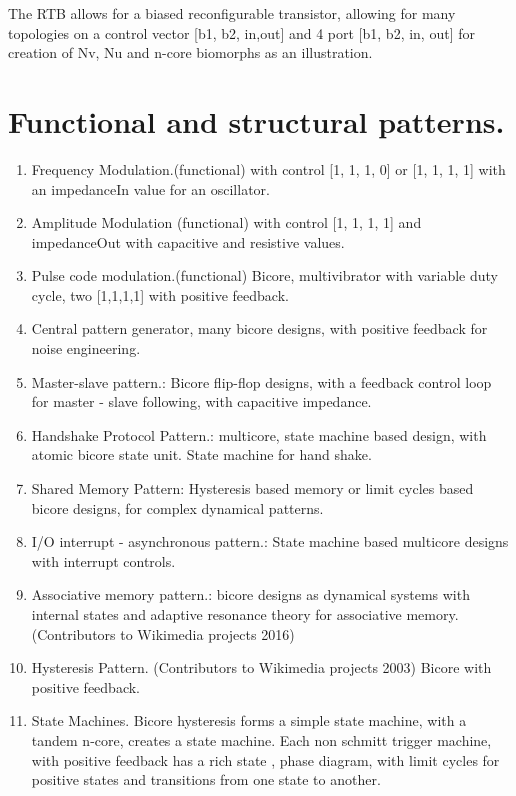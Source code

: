 \documentclass[conference]{IEEEtran}
\begin{document}
\sunsection{}
The RTB allows for a biased reconfigurable
transistor, allowing for many topologies on a
control vector [b1, b2, in,out] and 4 port [b1,
b2, in, out] for creation of Nv, Nu and n-core
biomorphs as an illustration.

\section{Functional and structural patterns.}
\begin{enumerate}
\item  Frequency Modulation.(functional) with control [1, 1, 1, 0] or [1, 1, 1, 1] with an impedanceIn value for an oscillator.
\item  Amplitude Modulation (functional) with control [1, 1, 1, 1] and impedanceOut with capacitive and resistive values.
\item Pulse code modulation.(functional) Bicore, multivibrator with variable duty cycle, two [1,1,1,1] with positive feedback.
\item Central pattern generator, many bicore designs, with positive feedback for noise engineering.
\item Master-slave pattern.: Bicore flip-flop designs, with a feedback control loop for master - slave following, with capacitive impedance.
\item  Handshake Protocol Pattern.: multicore, state machine based design, with atomic bicore state unit. State machine for hand shake.
\item Shared Memory Pattern: Hysteresis based memory or limit cycles based bicore designs, for complex dynamical patterns.
\item  I/O interrupt - asynchronous pattern.: State machine based multicore designs with interrupt controls.
\item  Associative memory pattern.: bicore designs as dynamical systems with internal states and adaptive resonance theory for associative memory.(Contributors to Wikimedia projects 2016)
\item  Hysteresis Pattern. (Contributors to Wikimedia projects 2003) Bicore with positive feedback.
\item  State Machines. Bicore hysteresis forms a simple state machine, with a tandem n-core, creates a state machine. Each non schmitt trigger machine, with positive feedback has a rich state , phase diagram, with limit cycles for positive states and transitions from one state to another.
\end{enumerate}
\end{document}
